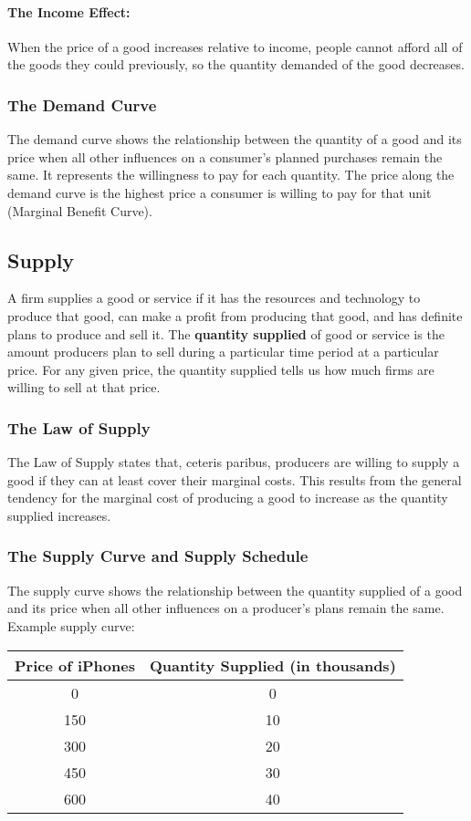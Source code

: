 \documentclass[letterpaper, 12pt]{article}
\begin{document}
\paragraph{The Income Effect:}
When the price of a good increases relative to income, people cannot afford all
of the goods they could previously, so the quantity demanded of the good
decreases.

\subsubsection{The Demand Curve}
The demand curve shows the relationship between the quantity of a good and
its price when all other influences on a consumer's planned purchases remain
the same. It represents the willingness to pay for each quantity. The price
along the demand curve is the highest price a consumer is willing to pay
for that unit (Marginal Benefit Curve).

\subsection{Supply}
A firm supplies a good or service if it has the resources and technology to
produce that good, can make a profit from producing that good, and has
definite plans to produce and sell it. The \textbf{quantity supplied} of good
or service is the amount producers plan to sell during a particular time
period at a particular price. For any given price, the quantity supplied
tells us how much firms are willing to sell at that price.

\subsubsection{The Law of Supply}
The Law of Supply states that, ceteris paribus, producers are willing to supply
a good if they can at least cover their marginal costs. This results from the
general tendency for the marginal cost of producing a good to increase as the
quantity supplied increases.

\subsubsection{The Supply Curve and Supply Schedule}
The supply curve shows the relationship between the quantity supplied of a good
and its price when all other influences on a producer's plans remain the same.
Example supply curve:
\begin{center}
  \begin{tabular}{|c|c|}
    \hline
    Price of iPhones & Quantity Supplied (in thousands) \\ \hline
    0   & 0  \\ \hline
    150 & 10 \\ \hline
    300 & 20 \\ \hline
    450 & 30 \\ \hline
    600 & 40 \\ \hline
  \end{tabular}
\end{center}
\end{document}
